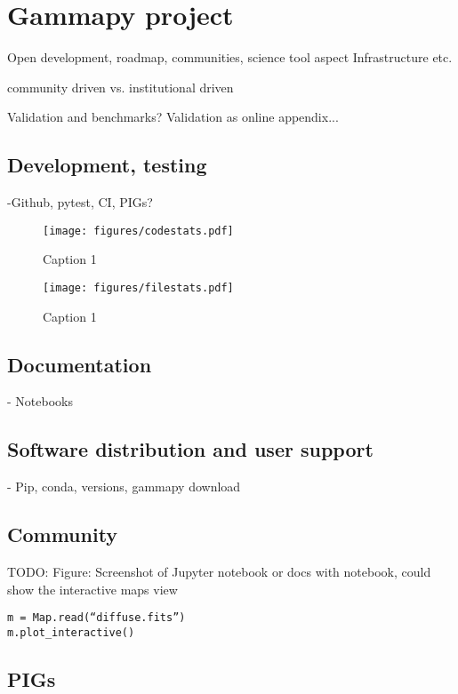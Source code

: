 \section{Gammapy project}
\label{sec:gammapy-project}

Open development, roadmap, communities, science tool aspect Infrastructure etc.

community driven vs. institutional driven

Validation and benchmarks? Validation as online appendix...

\subsection{Development, testing}
\label{ssec:development-testing}
-Github, pytest, CI, PIGs?



\begin{figure}[t]
	\centering
	\texttt{[image: figures/codestats.pdf]}
    \caption{
        Caption 1
    }
	\label{fig:codestats:lang}
\end{figure}

\begin{figure}[t]
	\centering
	\texttt{[image: figures/filestats.pdf]}
    \caption{
        Caption 1
    }
	\label{fig:codestats:file}
\end{figure}

\subsection{Documentation}
\label{ssec:documentation}

- Notebooks

\subsection{Software distribution and user support}
\label{ssec:software-distribution-and-user-support}
- Pip, conda, versions, gammapy download

\subsection{Community}
\label{ssec:community}
TODO: Figure: Screenshot of Jupyter notebook or docs with notebook, could show
the interactive maps view
\begin{verbatim}
m = Map.read(“diffuse.fits”)
m.plot_interactive()
\end{verbatim}

\subsection{PIGs}
\label{ssec:pigs}
